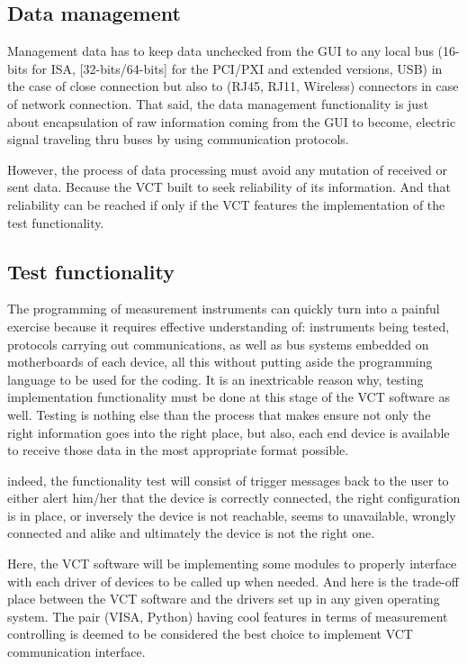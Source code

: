 \documentclass [10pt]{article}
\begin{document}
\subsection{Data management}
Management data has to keep data unchecked from the GUI to any local bus (16-bits for ISA, [32-bits/64-bits] for the PCI/PXI and extended versions, USB) in the case of  close connection but also to (RJ45, RJ11, Wireless) connectors in case of network connection. That said, the data management functionality is just about encapsulation of raw information coming from the GUI to become, electric signal traveling thru buses by using communication protocols.\par
However, the process of data processing must avoid any mutation of received or sent data. Because the VCT built to seek reliability of its information. And that reliability can be reached if only if the VCT features the implementation of the test functionality.
 
\subsection{Test functionality}

The programming of measurement instruments can quickly turn into a painful exercise because it requires effective understanding of: instruments being tested, protocols carrying out communications, as well as bus systems embedded on motherboards of each device, all this without putting aside the programming language to be used for the coding. It is an inextricable reason why, testing implementation functionality must be done at this stage of the VCT software as well. Testing is nothing else than the process that makes ensure not only the right information goes into the right place, but also, each end device is available to receive those data in the most appropriate format possible.
\par
indeed, the functionality test will consist of trigger messages back to the user to either alert him/her that the device is correctly connected, the right configuration is in place, or inversely the device is not reachable, seems to unavailable, wrongly connected and alike and ultimately the device is not the right one.\par
Here, the VCT software will be implementing some modules to properly interface with each driver of devices to be called up   when needed. And here is the trade-off place between the VCT software and the drivers set up in any given operating system. The pair (VISA, Python) having cool features in terms of   measurement controlling is deemed to be considered the best choice to implement VCT communication interface. 
\end{document}
